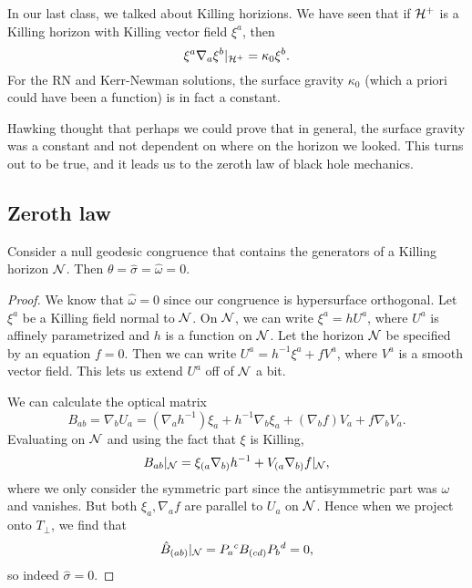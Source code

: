 In our last class, we talked about Killing horizions. We have seen that if $\mathcal H^+$ is a Killing horizon with Killing vector field $\xi^a$, then
\begin{equation}
    \xi^a \nabla_a \xi^b|_{\mathcal H^+} = \kappa_0 \xi^b.
\end{equation}
For the RN and Kerr-Newman solutions, the surface gravity $\kappa_0$ (which a priori could have been a function) is in fact a constant.

Hawking thought that perhaps we could prove that in general, the surface gravity was a constant and not dependent on where on the horizon we looked. This turns out to be true, and it leads us to the zeroth law of black hole mechanics.

\subsection*{Zeroth law}
\begin{prop}
    Consider a null geodesic congruence that contains the generators of a Killing horizon $\mathcal N$. Then $\theta=\hat \sigma =\hat \omega=0$.
\end{prop}
\begin{proof}
    We know that $\hat \omega=0$ since our congruence is hypersurface orthogonal.%
    Let $\xi^a$ be a Killing field normal to $\mathcal N$. On $\mathcal N$, we can write $\xi^a= hU^a$, where $U^a$ is affinely parametrized and $h$ is a function on $\mathcal N$.
    Let the horizon $\mathcal N$ be specified by an equation $f=0$. Then we can write $U^a=h^{-1} \xi^a + f V^a$, where $V^a$ is a smooth vector field. This lets us extend $U^a$ off of $\mathcal N$ a bit.
    
    We can calculate the optical matrix
    \begin{equation}
        B_{ab}=\nabla_b U_a = (\nabla_a h^{-1})\xi_a + h^{-1} \nabla_b \xi_a + (\nabla_b f)V_a +f \nabla_b V_a.
    \end{equation}
    Evaluating on $\mathcal N$ and using the fact that $\xi$ is Killing,
    \begin{equation}
        B_{ab}|_\mathcal N = \xi_{(a}\nabla_{b)} h^{-1} + V_{(a}\nabla_{b)}f|_{\mathcal N},
    \end{equation}
    where we only consider the symmetric part since the antisymmetric part was $\omega$ and vanishes. But both $\xi_a,\nabla_a f$ are parallel to $U_a$ on $\mathcal N$. Hence when we project onto $T_\perp$, we find that
    \begin{equation}
        \hat B_{(ab)}|_\mathcal N = P_a{}^c B_{(cd)} P_b{}^d = 0,
    \end{equation}
    so indeed $\hat \sigma=0$.
\end{proof}

